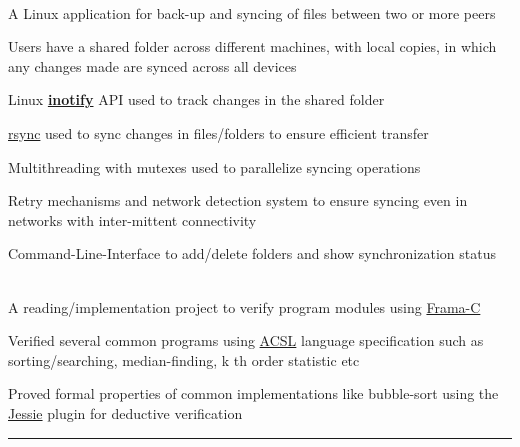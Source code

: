 \documentclass[letterpaper]{Formatting}
\begin{document}
\begin{minipage}[t]{0.66\textwidth}
\\
\vspace{1ex}
A Linux application for back-up and syncing of files between two or more peers
\vspace{\topsep} %
\footnotesize{
\begin{tightitemize}
\item Users have a shared folder across different machines, with local copies, in which any changes made are synced across all devices
\item Linux \href{http://man7.org/linux/man-pages/man7/inotify.7.html}{\textbf{inotify}} API used to track changes in the shared folder
\item \href{http://linux.about.com/library/cmd/blcmdl1_rsync.htm}{rsync} used to sync changes in files/folders to ensure efficient transfer
\item Multithreading with mutexes used to parallelize syncing operations
\item Retry mechanisms and network detection system to ensure syncing even in networks with inter-mittent connectivity
\item Command-Line-Interface to add/delete folders and show synchronization status
\end{tightitemize}
}
\sectionspace %
\vspace{2ex}
\\
\vspace{1ex}
A reading/implementation project to verify program modules using \href{http://frama-c.com/}{Frama-C}
\vspace{\topsep}
\footnotesize{
\begin{tightitemize}
\item Verified several common programs using \href{frama-c.com/acsl.html}{ACSL} language specification such as sorting/searching, median-finding, k th order statistic etc
\item Proved formal properties of common implementations like bubble-sort using the \href{krakatoa.lri.fr/jessie.pdf}{Jessie} plugin for deductive verification
\end{tightitemize}
}
\sectionspace
\vspace{2ex}
\rule{12cm}{0.5pt}


\end{minipage}
\end{document}
